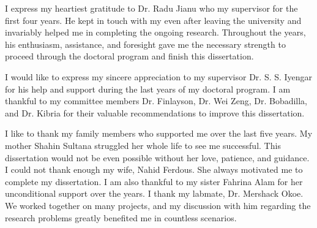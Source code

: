 \begin{acknowledgments}
I express my heartiest gratitude to Dr. Radu Jianu who my supervisor for the first four years. He kept in touch with my even after leaving the university and invariably helped me in completing the ongoing research. Throughout the years, his enthusiasm, assistance, and foresight gave me the necessary strength to proceed through the doctoral program and finish this dissertation. 

I would like to express my sincere appreciation to my supervisor Dr.  S. S. Iyengar for his help and support during the last years of my doctoral program. I am thankful to my committee members Dr. Finlayson, Dr. Wei Zeng, Dr. Bobadilla, and Dr. Kibria for their valuable recommendations to improve this dissertation. 

I like to thank my family members who supported me over the last five years. My mother Shahin Sultana struggled her whole life to see me successful. This dissertation would not be even possible without her love, patience, and guidance.  I could not thank enough my wife, Nahid Ferdous. She always motivated me to complete my dissertation. I am also thankful to my sister Fahrina Alam for her unconditional support over the years.  I thank my labmate, Dr. Mershack Okoe. We worked together on many projects, and my discussion with him regarding the research problems greatly benefited me in countless scenarios. 
\end{acknowledgments}